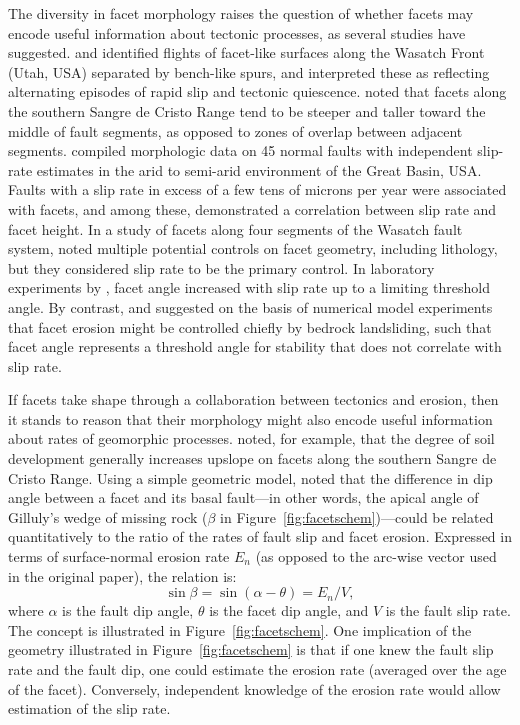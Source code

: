 The diversity in facet morphology raises the question of whether facets may encode useful information about tectonic processes, as several studies have suggested. \citet{hamblin1976patterns} and \citet{anderson1977compound} identified flights of facet-like surfaces along the Wasatch Front (Utah, USA) separated by bench-like spurs, and interpreted these as reflecting alternating episodes of rapid slip and tectonic quiescence. \citet{menges1990soils} noted that facets along the southern Sangre de Cristo Range tend to be steeper and taller toward the middle of fault segments, as opposed to zones of overlap between adjacent segments. \citet{depolo2000estimating} compiled morphologic data on 45 normal faults with independent slip-rate estimates in the arid to semi-arid environment of the Great Basin, USA. Faults with a slip rate in excess of a few tens of microns per year were associated with facets, and among these, \citet{depolo2000estimating} demonstrated a correlation between slip rate and facet height. In a study of facets along four segments of the Wasatch fault system, \citet{zuchiewicz2000geometry} noted multiple potential controls on facet geometry, including lithology, but they considered slip rate to be the primary control. In laboratory experiments by \citet{strak2011interaction}, facet angle increased with slip rate up to a limiting threshold angle. By contrast, \citet{densmore1998landsliding} and \citet{ellis1999development} suggested on the basis of numerical model experiments that facet erosion might be controlled chiefly by bedrock landsliding, such that facet angle represents a threshold angle for stability that does not correlate with slip rate.

If facets take shape through a collaboration between tectonics and erosion, then it stands to reason that their morphology might also encode useful information about rates of geomorphic processes. \citet{menges1990soils} noted, for example, that the degree of soil development generally increases upslope on facets along the southern Sangre de Cristo Range. Using a simple geometric model, \citet{tucker2011geomorphic} noted that the difference in dip angle between a facet and its basal fault---in other words, the apical angle of Gilluly's wedge of missing rock ($\beta$ in Figure~\ref{fig:facetschem})---could be related quantitatively to the ratio of the rates of fault slip and facet erosion. Expressed in terms of surface-normal erosion rate $E_n$ (as opposed to the arc-wise vector used in the original paper), the relation is:
\begin{equation}
\sin \beta = \sin ( \alpha - \theta ) = E_n / V,
\label{eq:predangle}
\end{equation}
where $\alpha$ is the fault dip angle, $\theta$ is the facet dip angle, and $V$ is the fault slip rate. The concept is illustrated in Figure~\ref{fig:facetschem}. One implication of the geometry illustrated in Figure~\ref{fig:facetschem} is that if one knew the fault slip rate and the fault dip, one could estimate the erosion rate (averaged over the age of the facet). Conversely, independent knowledge of the erosion rate would allow estimation of the slip rate.

